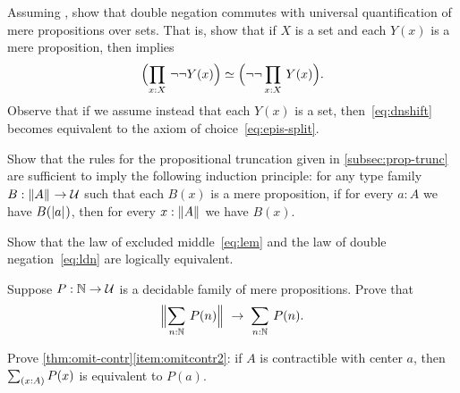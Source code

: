 \begin{ex}
  Assuming \LEM{}, show that double negation commutes with universal quantification of mere propositions over sets.
  That is, show that if $X$ is a set and each $Y(x)$ is a mere proposition, then \LEM{} implies
  \begin{equation}
    \eqv{\Parens{\prd{x:X} \neg\neg Y(x)}}{\Parens{\neg\neg \prd{x:X} Y(x)}}.\label{eq:dnshift}
  \end{equation}
  Observe that if we assume instead that each $Y(x)$ is a set, then~\eqref{eq:dnshift} becomes equivalent to the axiom of choice~\eqref{eq:epis-split}.
\end{ex}

\begin{ex}\label{ex:prop-trunc-ind}
  Show that the rules for the propositional truncation given in \autoref{subsec:prop-trunc} are sufficient to imply the following induction principle: for any type family $B:\mathopen{}\left\Vert A\right\Vert_{}\mathclose{} \to \mathcal{U}$ such that each $B(x)$ is a mere proposition, if for every $a:A$ we have $B(\mathopen{}\left|a\right|_{}^{}\mathclose{})$, then for every $x:\mathopen{}\left\Vert A\right\Vert_{}\mathclose{}$ we have $B(x)$.
\end{ex}

\begin{ex}\label{ex:lem-ldn}
  Show that the law of excluded middle~\eqref{eq:lem} and the law of double negation~\eqref{eq:ldn} are logically equivalent.
\end{ex}

\begin{ex}\label{ex:decidable-choice}
  Suppose $P:\mathbb{N}\to\mathcal{U}$ is a decidable family of mere propositions.
  Prove that
  \[ \Brck{\sm{n:\nat} P(n)} \;\to\; \sm{n:\nat}P(n).\]
\end{ex}

\begin{ex}\label{ex:omit-contr2}
  Prove \autoref{thm:omit-contr}\ref{item:omitcontr2}: if $A$ is contractible with center $a$, then $\sm{x:A} P(x)$ is equivalent to $P(a)$.
\end{ex}


